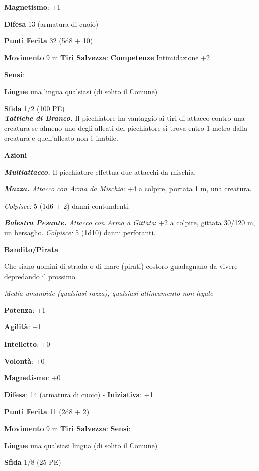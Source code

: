 \begin{multicols}{2}
\textbf{Magnetismo}: +1

\textbf{Difesa} 13 (armatura di cuoio)

\textbf{Punti Ferita} 32 (5d8 + 10)

\textbf{Movimento} 9 m
\textbf{Tiri Salvezza}:
\textbf{Competenze} Intimidazione +2

\textbf{Sensi}: 

\textbf{Lingue} una lingua qualsiasi (di solito il Comune)

\textbf{Sfida} 1/2 (100 PE)\smallskip\\

\emph{\textbf{Tattiche di Branco.}} Il picchiatore ha vantaggio ai tiri
di attacco contro una creatura se almeno uno degli alleati del
picchiatore si trova entro 1 metro dalla creatura e quell'alleato non
è inabile.

\smallskip\textbf{Azioni}

\emph{\textbf{Multiattacco.}} Il picchiatore effettua due attacchi da
mischia.

\emph{\textbf{Mazza.} Attacco con Arma da Mischia}: +4 a colpire,
portata 1 m, una creatura.

\emph{Colpisce:} 5 (1d6 + 2) danni contundenti.

\emph{\textbf{Balestra Pesante.} Attacco con Arma a Gittata}: +2 a
colpire, gittata 30/120 m, un bersaglio. \emph{Colpisce:} 5 (1d10) danni
perforanti.

\textbf{Bandito/Pirata}

Che siano uomini di strada o di mare (pirati) costoro guadagnano da
vivere depredando il prossimo.

\emph{Media umanoide (qualsiasi razza), qualsiasi allineamento non
legale}

\textbf{Potenza}: +1

\textbf{Agilità}: +1

\textbf{Intelletto}: +0

\textbf{Volontà}: +0

\textbf{Magnetismo}: +0

\textbf{Difesa}: 14 (armatura di cuoio) - \textbf{Iniziativa}: +1

\textbf{Punti Ferita} 11 (2d8 + 2)

\textbf{Movimento} 9 m
\textbf{Tiri Salvezza}:
\textbf{Sensi}: 

\textbf{Lingue} una qualsiasi lingua (di solito il Comune)

\textbf{Sfida} 1/8 (25 PE)\smallskip\\


\end{multicols}
